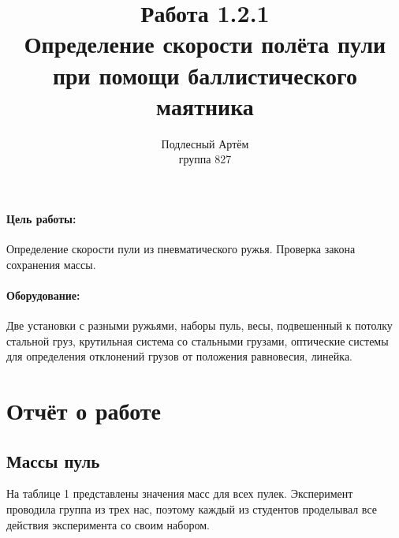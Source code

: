 \documentclass[a4paper, 12pt]{article}%
\author{Подлесный Артём \\ группа 827}
\title{Работа 1.2.1 \\ Определение скорости полёта пули при помощи баллистического маятника}
\begin{document}
\maketitle

\paragraph{Цель работы:}
Определение скорости пули из пневматического ружья. Проверка закона сохранения массы.
\paragraph{Оборудование:}
Две установки с разными ружьями, наборы пуль, весы, подвешенный к потолку стальной груз, крутильная система со стальными грузами, оптические системы для определения отклонений грузов от положения равновесия, линейка. 
\section{Отчёт о работе}
\subsection{Массы пуль}

На таблице 1 представлены значения масс для всех пулек. Эксперимент проводила группа из трех нас, поэтому каждый из студентов проделывал все действия эксперимента со своим набором.
\end{document}
